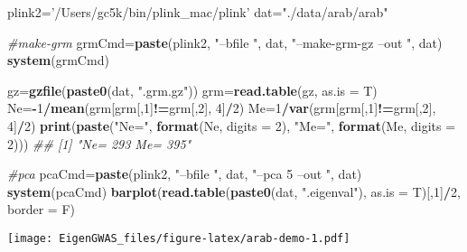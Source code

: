 \documentclass[]{book}
\newenvironment{Shaded}{\begin{snugshade}}{\end{snugshade}}
\newcommand{\CommentTok}[1]{\textcolor[rgb]{0.56,0.35,0.01}{\textit{#1}}}
\newcommand{\DataTypeTok}[1]{\textcolor[rgb]{0.13,0.29,0.53}{#1}}
\newcommand{\DecValTok}[1]{\textcolor[rgb]{0.00,0.00,0.81}{#1}}
\newcommand{\KeywordTok}[1]{\textcolor[rgb]{0.13,0.29,0.53}{\textbf{#1}}}
\newcommand{\NormalTok}[1]{#1}
\newcommand{\OperatorTok}[1]{\textcolor[rgb]{0.81,0.36,0.00}{\textbf{#1}}}
\newcommand{\StringTok}[1]{\textcolor[rgb]{0.31,0.60,0.02}{#1}}
\begin{document}
\begin{Shaded}
\begin{Highlighting}[]
\NormalTok{plink2=}\StringTok{'/Users/gc5k/bin/plink_mac/plink'}
\NormalTok{dat=}\StringTok{"./data/arab/arab"}

\CommentTok{#make-grm}
\NormalTok{grmCmd=}\KeywordTok{paste}\NormalTok{(plink2, }\StringTok{"--bfile "}\NormalTok{, dat, }\StringTok{"--make-grm-gz --out "}\NormalTok{, dat)}
\KeywordTok{system}\NormalTok{(grmCmd)}

\NormalTok{gz=}\KeywordTok{gzfile}\NormalTok{(}\KeywordTok{paste0}\NormalTok{(dat, }\StringTok{".grm.gz"}\NormalTok{))}
\NormalTok{grm=}\KeywordTok{read.table}\NormalTok{(gz, }\DataTypeTok{as.is =}\NormalTok{ T)}
\NormalTok{Ne=}\OperatorTok{-}\DecValTok{1}\OperatorTok{/}\KeywordTok{mean}\NormalTok{(grm[grm[,}\DecValTok{1}\NormalTok{]}\OperatorTok{!=}\NormalTok{grm[,}\DecValTok{2}\NormalTok{], }\DecValTok{4}\NormalTok{]}\OperatorTok{/}\DecValTok{2}\NormalTok{)}
\NormalTok{Me=}\DecValTok{1}\OperatorTok{/}\KeywordTok{var}\NormalTok{(grm[grm[,}\DecValTok{1}\NormalTok{]}\OperatorTok{!=}\NormalTok{grm[,}\DecValTok{2}\NormalTok{], }\DecValTok{4}\NormalTok{]}\OperatorTok{/}\DecValTok{2}\NormalTok{)}
\KeywordTok{print}\NormalTok{(}\KeywordTok{paste}\NormalTok{(}\StringTok{"Ne="}\NormalTok{, }\KeywordTok{format}\NormalTok{(Ne, }\DataTypeTok{digits =} \DecValTok{2}\NormalTok{), }\StringTok{"Me="}\NormalTok{, }\KeywordTok{format}\NormalTok{(Me, }\DataTypeTok{digits =} \DecValTok{2}\NormalTok{)))}
\CommentTok{## [1] "Ne= 293 Me= 395"}

\CommentTok{#pca}
\NormalTok{pcaCmd=}\KeywordTok{paste}\NormalTok{(plink2, }\StringTok{"--bfile "}\NormalTok{, dat, }\StringTok{"--pca 5 --out "}\NormalTok{, dat)}
\KeywordTok{system}\NormalTok{(pcaCmd)}
\KeywordTok{barplot}\NormalTok{(}\KeywordTok{read.table}\NormalTok{(}\KeywordTok{paste0}\NormalTok{(dat, }\StringTok{".eigenval"}\NormalTok{), }\DataTypeTok{as.is =}\NormalTok{ T)[,}\DecValTok{1}\NormalTok{]}\OperatorTok{/}\DecValTok{2}\NormalTok{, }\DataTypeTok{border =}\NormalTok{ F)}
\end{Highlighting}
\end{Shaded}

\texttt{[image: EigenGWAS\_files/figure-latex/arab-demo-1.pdf]}
\end{document}
